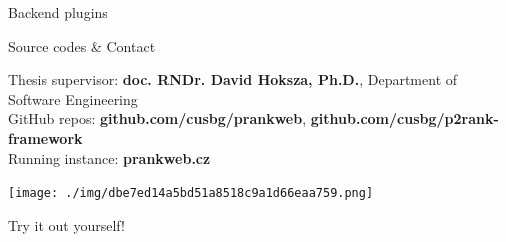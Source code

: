 \documentclass[portrait,a0paper,fontscale=0.25]{baposter}
\begin{document}
\begin{poster}
\begin{posterbox}[column=1, name=result2, below=result1]{Backend plugins}
\end{posterbox}


\begin{posterbox}[column=1, name=conclusion, below=result2, bottomaligned=tech]{Source codes \& Contact}


\begin{minipage}[t]{\linewidth}
	\begin{minipage}[t]{0.75\linewidth}
		Thesis supervisor: \textbf{doc. RNDr. David Hoksza, Ph.D.}, Department of Software Engineering\\

		GitHub repos: \textbf{github.com/cusbg/prankweb}, \textbf{github.com/cusbg/p2rank-framework}\\

		Running instance: \textbf{prankweb.cz}
	\end{minipage}
	\quad
	\begin{minipage}[t]{0.20\linewidth}
		\vspace{-2ex}
		\texttt{[image: ./img/dbe7ed14a5bd51a8518c9a1d66eaa759.png]} %
		\begin{center}
			Try it out yourself!
		\end{center}
	\end{minipage}
\end{minipage}


\end{posterbox}

\end{poster}
\end{document}
